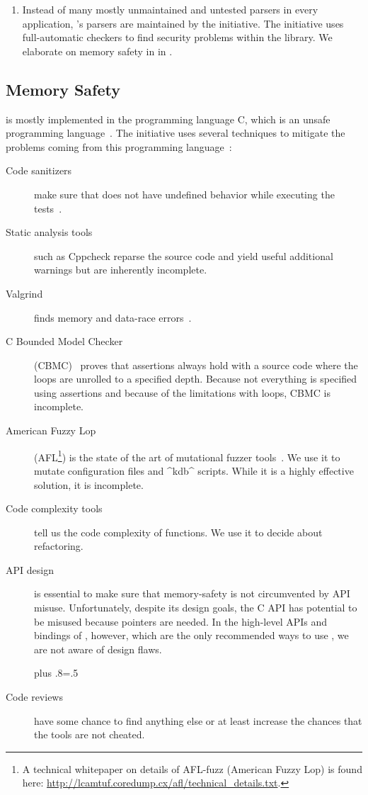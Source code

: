 \begin{code}[language=Cpp,firstnumber=19]
\begin{enumerate}
\item
Instead of many mostly unmaintained and untested parsers in every application, \elektra{}'s parsers are maintained by the \elektra{} initiative.
The \elektra{} initiative uses full-automatic checkers to find security problems within the library.
We elaborate on memory safety in \elektra{} in .
\end{enumerate}




\subsection{Memory Safety}
\label{sec:memory-safety}

\elektra{} is mostly implemented in the programming language C, which is an unsafe programming language~\cite{matsakis2014rust}.
The \elektra{} initiative uses several techniques to mitigate the problems coming from this programming language~\cite{torri2010evaluation}:

\begin{description}
\item[Code sanitizers] make sure that \elektra{} does not have undefined behavior while executing the tests~\cite{serebryany2012addresssanitizer}.
\item[Static analysis tools] such as Cppcheck reparse the source code and yield useful additional warnings but are inherently incomplete.
\item[Valgrind] finds memory and data-race errors~\cite{nethercote2007Valgrind}.
\item[C Bounded Model Checker] (CBMC)~\cite{kroening2014cbmc} proves that assertions always hold with a source code where the loops are unrolled to a specified depth.
Because not everything is specified using assertions and because of the limitations with loops, CBMC is incomplete.
\item[American Fuzzy Lop] (AFL\footnote{A technical whitepaper on details of AFL-fuzz (American Fuzzy Lop) is found here: \url{http://lcamtuf.coredump.cx/afl/technical_details.txt}.}) is the state of the art of mutational fuzzer tools~\cite{cha2015program}. We use it to mutate configuration files and ^kdb^ scripts. While it is a highly effective solution, it is incomplete.
\item[Code complexity tools] tell us the code complexity of functions.
We use it to decide about refactoring.
\item[API design] is essential to make sure that memory-safety is not circumvented by API misuse.
Unfortunately, despite its design goals, the C API has potential to be misused because pointers are needed.
In the high-level APIs and bindings of \elektra{}, however, which are the only recommended ways to use \elektra{}, we are not aware of design flaws.%
{\parfillskip=0pt plus .8\textwidth \emergencystretch=.5\textwidth \par}
\item[Code reviews] have some chance to find anything else or at least increase the chances that the tools are not cheated.
\end{description}


\end{code}
